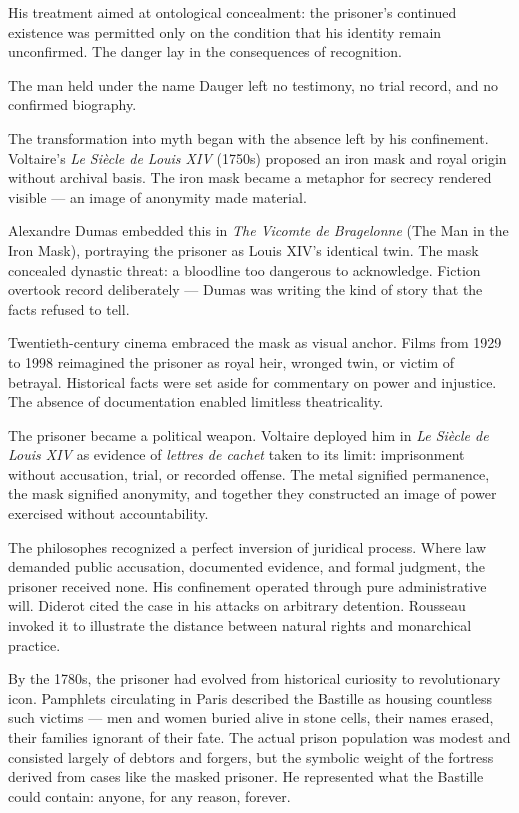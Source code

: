 His treatment aimed at ontological concealment: the prisoner's continued existence was permitted only on the condition that his identity remain unconfirmed. The danger lay in the consequences of recognition.

The man held under the name Dauger left no testimony, no trial record, and no confirmed biography. 

The transformation into myth began with the absence left by his confinement. Voltaire's \textit{Le Siècle de Louis XIV} (1750s) proposed an iron mask and royal origin without archival basis. The iron mask became a metaphor for secrecy rendered visible — an image of anonymity made material.

Alexandre Dumas embedded this in \textit{The Vicomte de Bragelonne} (The Man in the Iron Mask), portraying the prisoner as Louis XIV's identical twin. The mask concealed dynastic threat: a bloodline too dangerous to acknowledge. Fiction overtook record deliberately — Dumas was writing the kind of story that the facts refused to tell.

Twentieth-century cinema embraced the mask as visual anchor. Films from 1929 to 1998 reimagined the prisoner as royal heir, wronged twin, or victim of betrayal. Historical facts were set aside for commentary on power and injustice. The absence of documentation enabled limitless theatricality.

The prisoner became a political weapon. Voltaire deployed him in \textit{Le Siècle de Louis XIV} as evidence of \textit{lettres de cachet} taken to its limit: imprisonment without accusation, trial, or recorded offense. The metal signified permanence, the mask signified anonymity, and together they constructed an image of power exercised without accountability.

The philosophes recognized a perfect inversion of juridical process. Where law demanded public accusation, documented evidence, and formal judgment, the prisoner received none. His confinement operated through pure administrative will. Diderot cited the case in his attacks on arbitrary detention. Rousseau invoked it to illustrate the distance between natural rights and monarchical practice.

By the 1780s, the prisoner had evolved from historical curiosity to revolutionary icon. Pamphlets circulating in Paris described the Bastille as housing countless such victims — men and women buried alive in stone cells, their names erased, their families ignorant of their fate. The actual prison population was modest and consisted largely of debtors and forgers, but the symbolic weight of the fortress derived from cases like the masked prisoner. He represented what the Bastille could contain: anyone, for any reason, forever.

